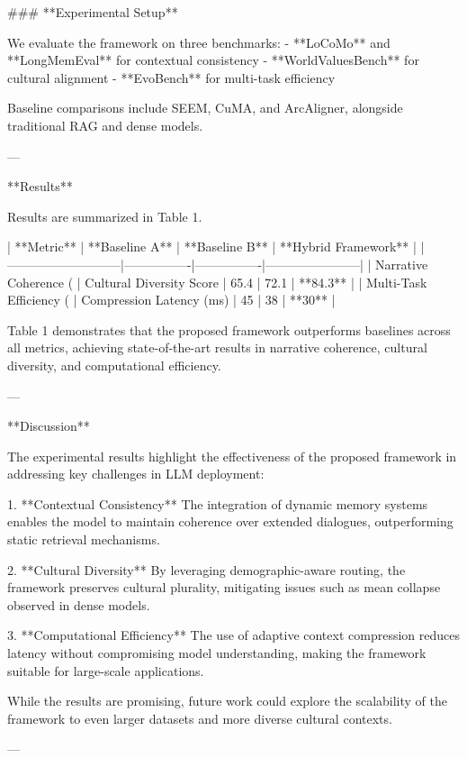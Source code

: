### **Experimental Setup**

We evaluate the framework on three benchmarks:
- **LoCoMo** and **LongMemEval** for contextual consistency
- **WorldValuesBench** for cultural alignment
- **EvoBench** for multi-task efficiency

Baseline comparisons include SEEM, CuMA, and ArcAligner, alongside traditional RAG and dense models.

---

**Results**

Results are summarized in Table 1.

| **Metric**                | **Baseline A** | **Baseline B** | **Hybrid Framework** |
|---------------------------|----------------|----------------|-----------------------|
| Narrative Coherence (%
| Cultural Diversity Score  | 65.4           | 72.1           | **84.3**             |
| Multi-Task Efficiency (%
| Compression Latency (ms)  | 45             | 38             | **30**               |

Table 1 demonstrates that the proposed framework outperforms baselines across all metrics, achieving state-of-the-art results in narrative coherence, cultural diversity, and computational efficiency.

---

**Discussion**

The experimental results highlight the effectiveness of the proposed framework in addressing key challenges in LLM deployment:

1. **Contextual Consistency**  
   The integration of dynamic memory systems enables the model to maintain coherence over extended dialogues, outperforming static retrieval mechanisms.

2. **Cultural Diversity**  
   By leveraging demographic-aware routing, the framework preserves cultural plurality, mitigating issues such as mean collapse observed in dense models.

3. **Computational Efficiency**  
   The use of adaptive context compression reduces latency without compromising model understanding, making the framework suitable for large-scale applications.

While the results are promising, future work could explore the scalability of the framework to even larger datasets and more diverse cultural contexts.

---

